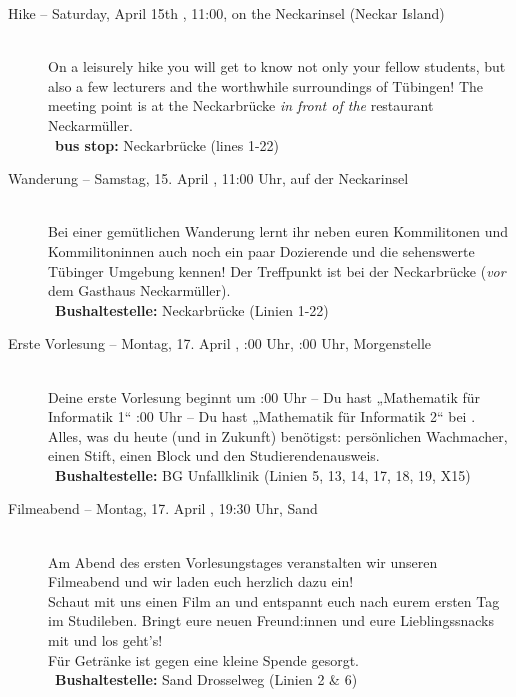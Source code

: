 \begin{description}
\ifml
	\item[Hike -- Saturday, April 15th \YEAR, 11:00, on the Neckarinsel (Neckar Island)]~\\
	On a leisurely hike you will get to know not only your fellow students,
	but also a few lecturers and the worthwhile surroundings of Tübingen!
	The meeting point is at the Neckarbrücke \emph{in front of the} restaurant \glqq Neckarmüller\grqq. \\
	~\textbf{bus stop:} Neckarbrücke (lines 1-22)
\else
	\item[Wanderung -- Samstag, 15. April \YEAR, 11:00 Uhr, auf der Neckarinsel]~\\
	Bei einer gemütlichen Wanderung lernt ihr neben euren Kommilitonen und Kommilitoninnen auch
	noch ein paar Dozierende und die sehenswerte Tübinger Umgebung kennen!
	Der Treffpunkt ist bei der Neckarbrücke (\emph{vor} dem Gasthaus \glqq Neckarmüller\grqq).\\
	~\textbf{Bushaltestelle:} Neckarbrücke (Linien 1-22)
\fi

\ifbachelor
	\item[Erste Vorlesung -- Montag, 17. April \YEAR, \ifwintersemester 8:00 Uhr, \else 10:00 Uhr, \fi Morgenstelle]~\\
	Deine erste Vorlesung beginnt um
	:00 Uhr -- Du hast „Mathematik für Informatik 1“  \fi
	:00 Uhr -- Du hast „Mathematik für Informatik 2“  \fi
	bei \Matheprof.
	Alles, was du heute (und in Zukunft) benötigst: persönlichen Wachmacher, einen Stift, einen Block und den Studierendenausweis.\\
	~\textbf{Bushaltestelle:} BG Unfallklinik (Linien 5, 13, 14, 17, 18, 19, X15)
\fi

\ifml
\else
	\item[Filmeabend -- Montag, 17. April \YEAR, 19:30 Uhr, Sand]~\\
	Am Abend des ersten Vorlesungstages veranstalten wir unseren Filmeabend und wir laden euch herzlich dazu ein!\\
	Schaut mit uns einen Film an und entspannt euch nach eurem ersten Tag im Studileben.
	Bringt eure neuen Freund:innen und eure Lieblingssnacks mit und los geht's!\\
	Für Getränke ist gegen eine kleine Spende gesorgt.\\
	~\textbf{Bushaltestelle:} Sand Drosselweg (Linien 2 \& 6)
\fi


\end{description}
